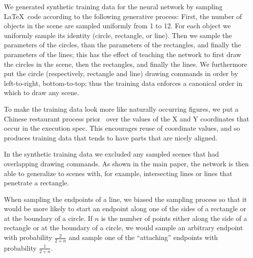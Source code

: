 \documentclass{article}
\begin{document}
We generated synthetic training data for the neural network by
sampling \LaTeX~code according to the following generative process:
First,
the number of objects in the scene are sampled uniformly from 1 to 12.
For each object we uniformly sample its identity (circle, rectangle, or line).
Then we sample the parameters of the circles,
than the parameters of the rectangles,
and finally the parameters of the lines;
this has the effect of teaching the network to first draw the circles in the scene,
then the rectangles,
and finally the lines.
We furthermore put the circle (respectively, rectangle and line) drawing commands in order by
left-to-right, bottom-to-top;
thus the training data enforces a canonical order in which to draw any scene.

To make the training data look more like naturally occurring figures,
we put a Chinese restaurant process prior~\cite{gershman2012tutorial} over
the values of the X and Y coordinates that occur in the execution spec.
This encourages reuse of coordinate values,
and so produces training data that tends to have parts that are nicely aligned.

In the synthetic training data we excluded any sampled scenes that had
overlapping drawing commands.  As shown in the main paper, the network
is then able to generalize to scenes with, for example, intersecting
lines or lines that penetrate a rectangle.

When sampling the endpoints of a line,
we biased the sampling process so that it would
be more likely to start an endpoint
along one of the sides of a rectangle or at the boundary of a circle.
If $n$ is the number of points either along the side of a rectangle or at the boundary of a circle,
we would sample an arbitrary endpoint with probability $\frac{2}{2 + n}$
and sample one of the ``attaching'' endpoints with probability $\frac{1}{2 + n}$.
\end{document}
